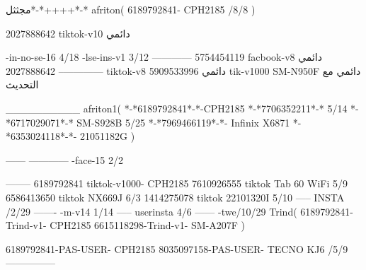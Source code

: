 مجثثل*-*++++*-*
afriton(
6189792841- CPH2185  /8/8
)

2027888642 tiktok-v10
دائمي

-in-no-se-16 4/18
-lse-ins-v1 3/12
------------
5754454119 facbook-v8
دائمي
--------------
2027888642 tiktok-v8
دائمي
5909533996 tik-v1000  SM-N950F
دائمي مع التحديث

__________
afriton1(
*-*6189792841*-*-CPH2185
*-*7706352211*-* 5/14
*-*6717029071*-*  SM-S928B 5/25
*-*7969466119*-*- Infinix X6871 \5
*-*6353024118*-*- 21051182G \5
)


------
------------
-face-15 2/2

--------
6189792841 tiktok-v1000- CPH2185 
7610926555 tiktok Tab 60 WiFi  5/9
6586413650 tiktok NX669J  6/3
1414275078 tiktok 22101320I  5/10
-----
 INSTA /2/29
-------
-m-v14 1/14
-----
userinsta 4/6
------
-twe/10/29
Trind(
6189792841-Trind-v1- CPH2185 
6615118298-Trind-v1- SM-A207F \5\9
)

6189792841-PAS-USER- CPH2185 
8035097158-PAS-USER- TECNO KJ6  /5/9
    ---------------
